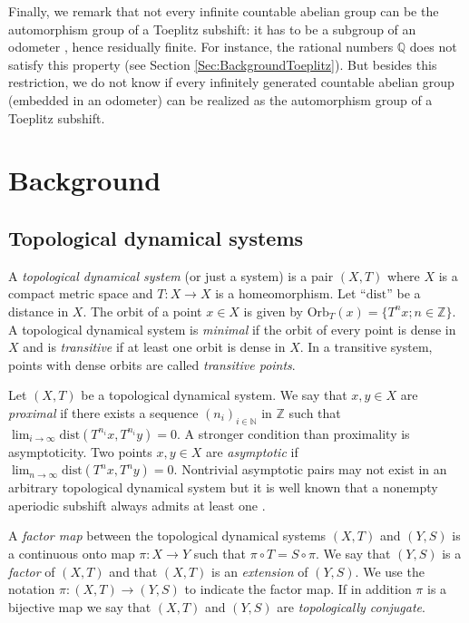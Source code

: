 \documentclass{daj}
\theoremstyle{plain}
\theoremstyle{definition}
\begin{document}
Finally, we remark that not every infinite countable abelian group can be the automorphism group of a Toeplitz subshift: it has to be a subgroup of an odometer \cite{DonosoDurandMaassPetite}, hence residually finite. For instance, the rational  numbers $\mathbb{Q}$ does not satisfy this property (see Section \ref{Sec:BackgroundToeplitz}). But besides this restriction, we do not know if every infinitely generated  countable abelian group (embedded in an odometer) can be realized as the automorphism group of a Toeplitz subshift. 

\section{Background}

\subsection{Topological dynamical systems} 

A {\it topological dynamical system} (or just a system) is a pair $(X,T)$ where $X$ is a compact metric space and $T\colon X \to X$ is a homeomorphism. 
Let $\text{``dist''}$ be a distance in $X$. The orbit of a point $x\in X$ is given by $\text{Orb}_T(x)= \{T^nx ; n\in \mathbb{Z}\}$. A topological dynamical system is {\it minimal} if the orbit of every point is dense in $X$ and is {\it transitive} if at least one orbit is dense in $X$. In a transitive system, points with dense orbits are called {\it transitive points}. 

Let $(X,T)$ be a topological dynamical system. We say that $x,y\in X$ are {\em proximal} if there exists a sequence $(n_i)_{i\in \mathbb{N}}$ in $\mathbb{Z}$ such that $\lim_{i\to \infty} \text{dist}(T^{n_i} x, T^{n_i} y)=0.$ A stronger condition than proximality is asymptoticity. Two points $x, y \in X$ are {\em asymptotic} if $\lim_{n\to \infty} \text{dist}(T^n x, T^n y) =0.$
Nontrivial asymptotic pairs may not exist in an arbitrary topological dynamical system but it is well known that a nonempty aperiodic subshift always admits at least one \cite[Chapter 1]{Aus}. 

A {\it factor map} between the topological dynamical systems $(X,T)$ and $(Y,S)$ is a continuous onto map $\pi\colon X\to Y$ such that $\pi\circ T=S\circ \pi$. We say that $(Y,S)$ is a {\it factor} of $(X,T)$ and that $(X,T)$ is an {\it extension} of $(Y,S)$. We use the notation $\pi\colon (X,T)\to (Y,S)$ to indicate the factor map. If in addition $\pi$ is a bijective map we say that $(X,T)$ and $(Y,S)$ are {\it topologically conjugate}. 
\end{document}
